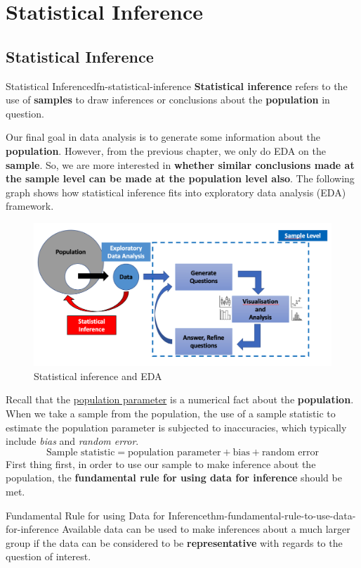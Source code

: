 \documentclass[math,code]{amznotes}
\theoremstyle{remark}
\begin{document}
\chapter{Statistical Inference}
\section{Statistical Inference}
\begin{dfnbox}{Statistical Inference}{dfn-statistical-inference}
    {\color{red} \textbf{Statistical inference}} refers to the use of \textbf{samples} to draw inferences or conclusions about the \textbf{population} in question.
\end{dfnbox}
Our final goal in data analysis is to generate some information about the \textbf{population}. However, from the previous chapter, we only do EDA on the \textbf{sample}. So, we are more interested in \textbf{whether similar conclusions made at the sample level can be made at the population level also}. The following graph shows how statistical inference fits into exploratory data analysis (EDA) framework.
\begin{figure}[H]
    \centering
    \includegraphics[width=0.6\linewidth]{images/chapter4-why-statistical-inference.png}
    \caption{Statistical inference and EDA}
    \label{fig:chapter4-why-statistical-inference}
\end{figure}
Recall that the \hyperref[dfn:dfn-population-parameter]{population parameter} is a numerical fact about the \textbf{population}. When we take a sample from the population, the use of a sample statistic to estimate the population parameter is subjected to inaccuracies, which typically include \textit{bias} and \textit{random error}.
\begin{equation*}
    \text{Sample statistic}=\text{population parameter}+\text{bias}+\text{random error}
\end{equation*}
First thing first, in order to use our sample to make inference about the population, the \textbf{fundamental rule for using data for inference} should be met.
\begin{thmbox}{Fundamental Rule for using Data for Inference}{thm-fundamental-rule-to-use-data-for-inference}
    Available data can be used to make inferences about a much larger group if the data can be considered to be \textbf{representative} with regards to the question of interest.
\end{thmbox}
\end{document}
